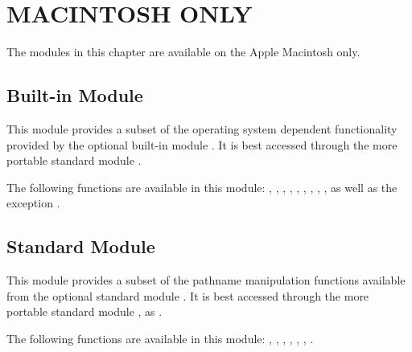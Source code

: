\chapter{MACINTOSH ONLY}

The modules in this chapter are available on the Apple Macintosh only.

\section{Built-in Module }

This module provides a subset of the operating system dependent
functionality provided by the optional built-in module .
It is best accessed through the more portable standard module
.

The following functions are available in this module:
,
,
,
,
,
,
,
,
,
as well as the exception .

\section{Standard Module }

This module provides a subset of the pathname manipulation functions
available from the optional standard module .  It is
best accessed through the more portable standard module , as
.

The following functions are available in this module:
,
,
,
,
,
,
.
